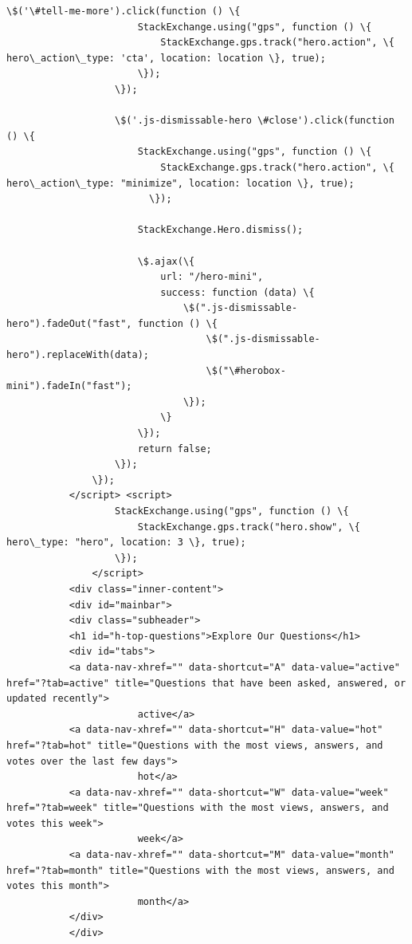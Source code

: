 \documentclass[11pt]{article}
\begin{document}
\begin{Verbatim}[commandchars=\\\{\}]
                   \$('\#tell-me-more').click(function () \{
                       StackExchange.using("gps", function () \{
                           StackExchange.gps.track("hero.action", \{ hero\_action\_type: 'cta', location: location \}, true);
                       \});
                   \});
           
                   \$('.js-dismissable-hero \#close').click(function () \{
                       StackExchange.using("gps", function () \{
                           StackExchange.gps.track("hero.action", \{ hero\_action\_type: "minimize", location: location \}, true);
                         \});
           
                       StackExchange.Hero.dismiss();
           
                       \$.ajax(\{
                           url: "/hero-mini",
                           success: function (data) \{
                               \$(".js-dismissable-hero").fadeOut("fast", function () \{
                                   \$(".js-dismissable-hero").replaceWith(data);
                                   \$("\#herobox-mini").fadeIn("fast");
                               \});
                           \}
                       \});
                       return false;
                   \});
               \});
           </script> <script>
                   StackExchange.using("gps", function () \{
                       StackExchange.gps.track("hero.show", \{ hero\_type: "hero", location: 3 \}, true);
                   \});
               </script>
           <div class="inner-content">
           <div id="mainbar">
           <div class="subheader">
           <h1 id="h-top-questions">Explore Our Questions</h1>
           <div id="tabs">
           <a data-nav-xhref="" data-shortcut="A" data-value="active" href="?tab=active" title="Questions that have been asked, answered, or updated recently">
                       active</a>
           <a data-nav-xhref="" data-shortcut="H" data-value="hot" href="?tab=hot" title="Questions with the most views, answers, and votes over the last few days">
                       hot</a>
           <a data-nav-xhref="" data-shortcut="W" data-value="week" href="?tab=week" title="Questions with the most views, answers, and votes this week">
                       week</a>
           <a data-nav-xhref="" data-shortcut="M" data-value="month" href="?tab=month" title="Questions with the most views, answers, and votes this month">
                       month</a>
           </div>
           </div>

\end{Verbatim}
\end{document}
